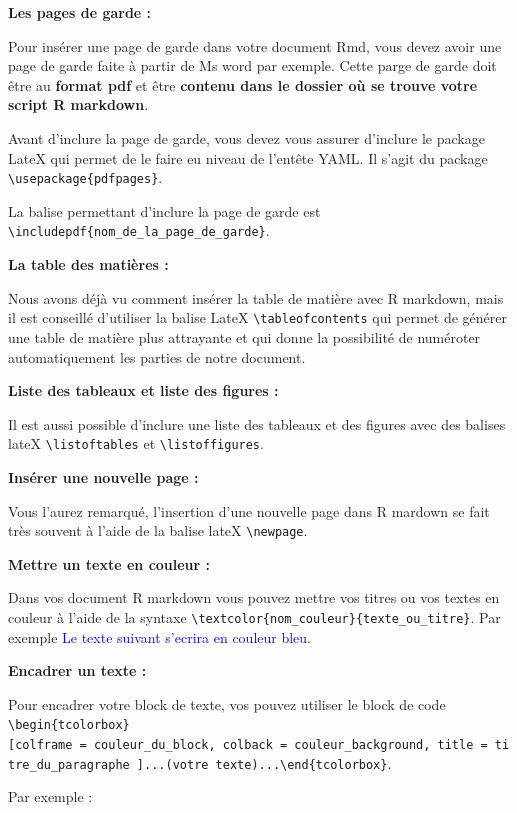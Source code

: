 \documentclass[
  12pt,
]{article}
\begin{document}
\textbf{Les pages de garde :}

Pour insérer une page de garde dans votre document Rmd, vous devez avoir
une page de garde faite à partir de Ms word par exemple. Cette parge de
garde doit être au \textbf{format pdf} et être \textbf{contenu dans le
dossier où se trouve votre script R markdown}.

Avant d'inclure la page de garde, vous devez vous assurer d'inclure le
package LateX qui permet de le faire eu niveau de l'entête YAML. Il
s'agit du package \texttt{\textbackslash{}usepackage\{pdfpages\}}.

La balise permettant d'inclure la page de garde est
\texttt{\textbackslash{}includepdf\{nom\_de\_la\_page\_de\_garde\}}.

\textbf{La table des matières :}

Nous avons déjà vu comment insérer la table de matière avec R markdown,
mais il est conseillé d'utiliser la balise LateX
\texttt{\textbackslash{}tableofcontents} qui permet de générer une table
de matière plus attrayante et qui donne la possibilité de numéroter
automatiquement les parties de notre document.

\textbf{Liste des tableaux et liste des figures :}

Il est aussi possible d'inclure une liste des tableaux et des figures
avec des balises lateX \texttt{\textbackslash{}listoftables} et
\texttt{\textbackslash{}listoffigures}.

\textbf{Insérer une nouvelle page :}

Vous l'aurez remarqué, l'insertion d'une nouvelle page dans R mardown se
fait très souvent à l'aide de la balise lateX
\texttt{\textbackslash{}newpage}.

\textbf{Mettre un texte en couleur :}

Dans vos document R markdown vous pouvez mettre vos titres ou vos textes
en couleur à l'aide de la syntaxe
\texttt{\textbackslash{}textcolor\{nom\_couleur\}\{texte\_ou\_titre\}}.
Par exemple \textcolor{blue}{Le texte suivant s'ecrira en couleur bleu}.

\textbf{Encadrer un texte :}

Pour encadrer votre block de texte, vos pouvez utiliser le block de code
\texttt{\textbackslash{}begin\{tcolorbox\}{[}colframe\ =\ couleur\_du\_block,\ colback\ =\ couleur\_background,\ title\ =\ titre\_du\_paragraphe\ {]}...(votre\ texte)...\textbackslash{}end\{tcolorbox\}}.

Par exemple :
\end{document}
